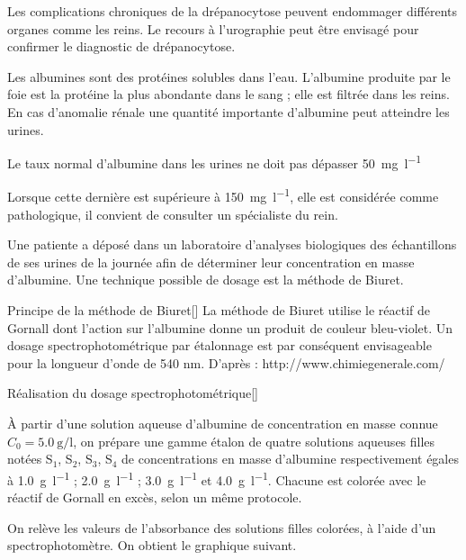 \label{exo:albuminurie}

\medskip
\motsClesAlbuminurie
\medskip

Les complications chroniques de la drépanocytose peuvent endommager différents organes comme les reins.
Le recours à l’urographie peut être envisagé pour confirmer le diagnostic de drépanocytose.


Les albumines sont des protéines solubles dans l'eau.
L’albumine produite par le foie est la protéine la plus abondante dans le sang ; elle est filtrée dans les reins.
En cas d’anomalie rénale une quantité importante d’albumine peut atteindre les urines.
\begin{listePoints}
  \item Le taux normal d'albumine dans les urines ne doit pas dépasser \qty{50}{\mg\per\l}
  \item Lorsque cette dernière est supérieure à \qty{150}{\mg\per\l}, elle est considérée comme pathologique, il convient de consulter un spécialiste du rein.
\end{listePoints}
Une patiente a déposé dans un laboratoire d'analyses biologiques des échantillons de ses urines de la journée afin de déterminer leur concentration en masse d'albumine.
Une technique possible de dosage est la méthode de Biuret.


\begin{doc}{Principe de la méthode de Biuret}[\label{doc:methode_biuret}]
La méthode de Biuret utilise le réactif de Gornall dont l’action sur l’albumine donne un
produit de couleur bleu-violet. Un dosage spectrophotométrique par étalonnage est par
conséquent envisageable pour la longueur d’onde de 540 nm.
D’après : http://www.chimiegenerale.com/
\end{doc}

\begin{doc}{Réalisation du dosage spectrophotométrique}[\label{doc:dosage_spectro}]
  
  À partir d’une solution aqueuse d’albumine de concentration en masse connue 
  $C_0 = \qty{5,0}{\g\per\l}$,
  on prépare une gamme étalon de quatre solutions aqueuses filles notées S$_1$, S$_2$, S$_3$, S$_4$ de concentrations en masse d’albumine respectivement égales à
  \qty{1,0}{\g\per\l} ; \qty{2,0}{\g\per\l} ; \qty{3,0}{\g\per\l} et \qty{4,0}{\g\per\l}.
  Chacune est colorée avec le réactif de Gornall en excès, selon un même protocole.
  
  
  On relève les valeurs de l’absorbance des solutions filles colorées, à l’aide d’un
  spectrophotomètre. On obtient le graphique suivant.
  
\end{doc}

